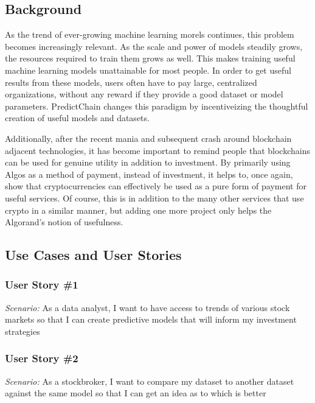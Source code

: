 \documentclass{article}
\begin{document}
    \subsection{Background}

    As the trend of ever-growing machine learning morels continues, this problem becomes increasingly relevant.
    As the scale and power of models steadily grows, the resources required to train them grows as well.  This makes training
    useful machine learning models unattainable for most people.  In order to get useful results from these models,
    users often have to pay large, centralized organizations, without any reward if they provide a good dataset or model
    parameters.  PredictChain changes this paradigm by incentiveizing the thoughtful creation of useful models and
    datasets.

    Additionally, after the recent mania and subsequent crash around blockchain adjacent technologies, it has become
    important to remind people that blockchains can be used for genuine utility in addition to investment.  By primarily
    using Algos as a method of payment, instead of investment, it helps to, once again, show that cryptocurrencies can
    effectively be used as a pure form of payment for useful services.  Of course, this is in addition to the many other
    services that use crypto in a similar manner, but adding one more project only helps the Algorand's notion of usefulness.


    \subsection{Use Cases and User Stories}

    \subsubsection*{User Story \#1}
    \textit{Scenario:} As a data analyst, I want to have access to trends of various stock markets so that I can create
    predictive models that will inform my investment strategies

    \subsubsection*{User Story \#2}
    \textit{Scenario:} As a stockbroker, I want to compare my dataset to another dataset against the same model so that
    I can get an idea as to which is better
\end{document}
